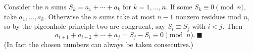 Consider the $n$ sums $S_k=a_1+\cdots+a_k$ for $k=1,\dots,n$. If some $S_k\equiv0\pmod n$, take $a_1,\dots,a_k$. Otherwise the $n$ sums take at most $n-1$ nonzero residues mod $n$, so by the pigeonhole principle two are congruent, say $S_i\equiv S_j$ with $i<j$. Then
\[a_{i+1}+a_{i+2}+\cdots+a_j=S_j-S_i\equiv0\pmod n.\ \blacksquare\]
(In fact the chosen numbers can always be taken consecutive.)
